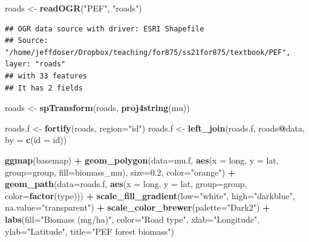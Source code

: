 \documentclass[
]{krantz}
\newenvironment{Shaded}{\begin{snugshade}}{\end{snugshade}}
\newcommand{\DataTypeTok}[1]{\textcolor[rgb]{0.13,0.29,0.53}{#1}}
\newcommand{\FloatTok}[1]{\textcolor[rgb]{0.00,0.00,0.81}{#1}}
\newcommand{\KeywordTok}[1]{\textcolor[rgb]{0.13,0.29,0.53}{\textbf{#1}}}
\newcommand{\NormalTok}[1]{#1}
\newcommand{\OperatorTok}[1]{\textcolor[rgb]{0.81,0.36,0.00}{\textbf{#1}}}
\newcommand{\StringTok}[1]{\textcolor[rgb]{0.31,0.60,0.02}{#1}}
\begin{document}
\begin{Shaded}
\begin{Highlighting}[]
\NormalTok{roads \textless{}{-}}\StringTok{ }\KeywordTok{readOGR}\NormalTok{(}\StringTok{"PEF"}\NormalTok{, }\StringTok{"roads"}\NormalTok{)}
\end{Highlighting}
\end{Shaded}

\begin{verbatim}
## OGR data source with driver: ESRI Shapefile 
## Source: "/home/jeffdoser/Dropbox/teaching/for875/ss21for875/textbook/PEF", layer: "roads"
## with 33 features
## It has 2 fields
\end{verbatim}

\begin{Shaded}
\begin{Highlighting}[]
\NormalTok{roads \textless{}{-}}\StringTok{ }\KeywordTok{spTransform}\NormalTok{(roads, }\KeywordTok{proj4string}\NormalTok{(mu))}

\NormalTok{roads.f \textless{}{-}}\StringTok{ }\KeywordTok{fortify}\NormalTok{(roads, }\DataTypeTok{region=}\StringTok{"id"}\NormalTok{)}
\NormalTok{roads.f \textless{}{-}}\StringTok{ }\KeywordTok{left\_join}\NormalTok{(roads.f, roads}\OperatorTok{@}\NormalTok{data, }\DataTypeTok{by =} \KeywordTok{c}\NormalTok{(}\StringTok{\textquotesingle{}id\textquotesingle{}}\NormalTok{ =}\StringTok{ \textquotesingle{}id\textquotesingle{}}\NormalTok{))}

\KeywordTok{ggmap}\NormalTok{(basemap) }\OperatorTok{+}
\StringTok{    }\KeywordTok{geom\_polygon}\NormalTok{(}\DataTypeTok{data=}\NormalTok{mu.f, }\KeywordTok{aes}\NormalTok{(}\DataTypeTok{x =}\NormalTok{ long, }\DataTypeTok{y =}\NormalTok{ lat, }\DataTypeTok{group=}\NormalTok{group, }
                                \DataTypeTok{fill=}\NormalTok{biomass\_mu), }
                 \DataTypeTok{size=}\FloatTok{0.2}\NormalTok{, }\DataTypeTok{color=}\StringTok{"orange"}\NormalTok{) }\OperatorTok{+}
\StringTok{    }\KeywordTok{geom\_path}\NormalTok{(}\DataTypeTok{data=}\NormalTok{roads.f, }\KeywordTok{aes}\NormalTok{(}\DataTypeTok{x =}\NormalTok{ long, }\DataTypeTok{y =}\NormalTok{ lat, }
                                \DataTypeTok{group=}\NormalTok{group, }\DataTypeTok{color=}\KeywordTok{factor}\NormalTok{(type))) }\OperatorTok{+}
\StringTok{    }\KeywordTok{scale\_fill\_gradient}\NormalTok{(}\DataTypeTok{low=}\StringTok{"white"}\NormalTok{, }\DataTypeTok{high=}\StringTok{"darkblue"}\NormalTok{, }
                        \DataTypeTok{na.value=}\StringTok{"transparent"}\NormalTok{) }\OperatorTok{+}
\StringTok{    }\KeywordTok{scale\_color\_brewer}\NormalTok{(}\DataTypeTok{palette=}\StringTok{"Dark2"}\NormalTok{) }\OperatorTok{+}
\StringTok{    }\KeywordTok{labs}\NormalTok{(}\DataTypeTok{fill=}\StringTok{"Biomass (mg/ha)"}\NormalTok{, }\DataTypeTok{color=}\StringTok{"Road type"}\NormalTok{, }\DataTypeTok{xlab=}\StringTok{"Longitude"}\NormalTok{, }
         \DataTypeTok{ylab=}\StringTok{"Latitude"}\NormalTok{, }\DataTypeTok{title=}\StringTok{"PEF forest biomass"}\NormalTok{)}
\end{Highlighting}
\end{Shaded}
\end{document}
